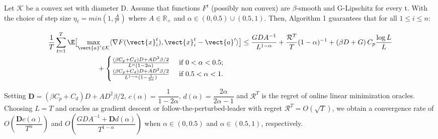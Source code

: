\setcounter{theorem}{0}

\begin{theorem}
Let $\mathcal{K}$ be a convex set with diameter D. Assume that functions $F^{t}$ (possibly non convex) are $\beta$-smooth and G-Lipschitz for every t. With the choice of step size $\eta_{\ell} = min\left(1, \frac{A}{\ell^{\alpha}}\right)$ where $A \in \mathbb{R_+}$ and $\alpha \in (0,0.5)\cup(0.5,1)$. 
Then, Algorithm 1 guarantees that for all $1 \leq i \leq n$:

    \begin{align*}
       \frac{1}{T} &\sum_{t=1}^{T} \E \bigl [ \max_{\vect{a}^{\prime} \in \mathcal{K}}\langle \nabla F(\vect{x}^t_{i}), \vect{x}^t_{i} - \vect{a}^{\prime}\rangle \bigr] \nonumber 
         \leq \frac{GDA^{-1}}{L^{1-\alpha}} + \frac{\mathcal{R}^T}{T}(1-\alpha)^{-1} + \left(\beta D + G \right)C_p \frac{\log L}{L} \nonumber \\
        & \qquad \qquad \qquad + \begin{cases}
                \frac{\left(\beta C_p +  C_d\right)D + A D^2 \beta / 2}{L^{\alpha}(1-2\alpha)} &\text{ if } 0 < \alpha < 0.5; \\
                \frac{\left(\beta C_p + C_d\right)D + A D^2 \beta / 2}{L^{1-\alpha}(1-\frac{1}{2\alpha})} &\text{ if } 0.5 < \alpha < 1.
         \end{cases}
    \end{align*}


Setting $\mathbf{D} = \left(\beta C_p + C_d\right)D + A D^2 \beta / 2$, $ c(\alpha)= \dfrac{1}{1-2\alpha}$, $d(\alpha) = \dfrac{2\alpha}{2\alpha - 1}$ and $\mathcal{R}^T$ is the regret of online linear minimization oracles. Choosing $L=T$ and oracles as gradient descent or follow-the-perturbed-leader with regret $\mathcal{R}^T =
O\left(\sqrt{T}\right)$, we obtain a convergence rate of $O\left(\dfrac{\mathbf{D}c(\alpha)}{T^{\alpha}} \right)$ and $O\left(\dfrac{GDA^{-1}+\mathbf{D} d(\alpha)}{T^{1-\alpha}} \right)$ when $\alpha \in (0,0.5) $ and $\alpha \in (0.5, 1)$, respectively.
\end{theorem}

